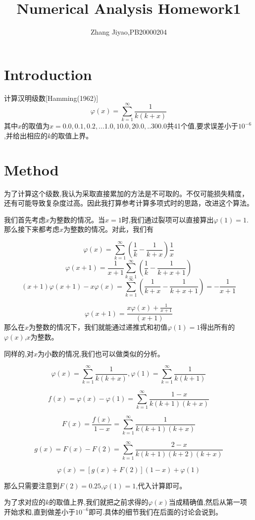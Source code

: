 \documentclass{article}
\title{Numerical Analysis Homework1}
\author{Zhang Jiyao,PB20000204}
\begin{document}
	\maketitle
	
	\section{Introduction}
	
	计算汉明级数[Hamming(1962)]
	$$\varphi(x)=\sum_{k=1}^{\infty}\frac{1}{k(k+x)}$$
	其中$x$的取值为$x=0.0,0.1,0.2,...1.0,10.0,20.0,..300.0$共41个值,要求误差小于$10^{-6}$,并给出相应的$k$的取值上界。
	
	\section{Method}
	
	为了计算这个级数,我认为采取直接累加的方法是不可取的。不仅可能损失精度，还有可能导致复杂度过高。因此我打算参考计算多项式时的思路，改进这个算法。
	
	我们首先考虑$x$为整数的情况。当$x=1$时,我们通过裂项可以直接算出$\varphi(1)=1$.那么接下来都考虑$x$为整数的情况。对此，我们有
	
	$$\varphi(x)=\sum_{k=1}^{\infty}(\frac{1}{k}-\frac{1}{k+x})\frac{1}{x}$$
	$$\varphi(x+1)=\frac{1}{x+1}\sum_{k=1}^{\infty}(\frac{1}{k}-\frac{1}{k+x+1})$$
	$$(x+1)\varphi(x+1)-x\varphi(x)=\sum_{k=1}^{\infty}(\frac{1}{k+x}-\frac{1}{k+x+1})=-\frac{1}{x+1}$$
	
	$$\varphi(x+1)=\frac{x\varphi(x)+\frac{1}{x+1}}{(x+1)}$$
	那么在$x$为整数的情况下，我们就能通过递推式和初值$\varphi(1)=1$得出所有的$\varphi(x)$,$x$为整数。
	
	同样的,对$x$为小数的情况,我们也可以做类似的分析。
	
	$$\varphi(x)=\sum_{k=1}^{\infty}\frac{1}{k(k+x)},\varphi(1)=\sum_{k=1}^{\infty}\frac{1}{k(k+1)}$$
	
	$$f(x)=\varphi(x)-\varphi(1)=\sum_{k=1}^{\infty}\frac{1-x}{k(k+1)(k+x)}$$
	
	$$F(x)=\frac{f(x)}{1-x}=\sum_{k=1}^{\infty}\frac{1}{k(k+1)(k+x)}$$
	
	$$g(x)=F(x)-F(2)=\sum_{k=1}^{\infty}\frac{2-x}{k(k+1)(k+2)(k+x)}$$
	
	$$\varphi(x)=[g(x)+F(2)](1-x)+\varphi(1)$$
	
	那么只需要注意到$F(2)=0.25$,$\varphi(1)=1$,代入计算即可。
	
	为了求对应的$k$的取值上界,我们就把之前求得的$\varphi(x)$当成精确值,然后从第一项开始求和,直到做差小于$10^{-6}$即可.具体的细节我们在后面的讨论会说到。
	
\end{document}
